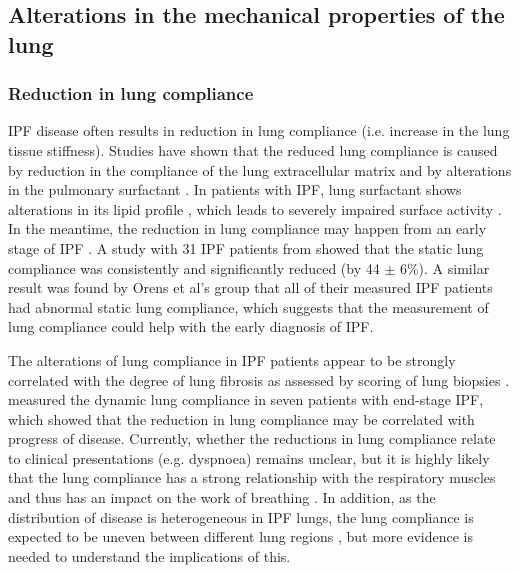 \subsection{Alterations in the mechanical properties of the lung} \label{MechanicalAlteration}
\subsubsection{Reduction in lung compliance}
IPF disease often results in reduction in lung compliance (i.e. increase in the lung tissue stiffness). Studies have shown that the reduced lung compliance is caused by reduction in the compliance of the lung extracellular matrix and by alterations in the pulmonary surfactant \citep{plantier2018physiology}. In patients with IPF, lung surfactant shows alterations in its lipid profile \citep{gunther1999surfactant, schmidt2002altered}, which leads to severely impaired surface activity \citep{gunther1999surfactant}. In the meantime, the reduction in lung compliance may happen from an early stage of IPF \citep{plantier2018physiology}. A study with 31 IPF patients from \cite{zielonka2010angiogenic} showed that the static lung compliance was consistently and significantly reduced (by 44 $\pm$ 6\%). A similar result was found by Orens et al's group \citep{orens1995sensitivity} that all of their measured IPF patients had abnormal static lung compliance, which suggests that the measurement of lung compliance could help with the early diagnosis of IPF.

The alterations of lung compliance in IPF patients appear to be strongly correlated with the degree of lung fibrosis as assessed by scoring of lung biopsies \citep{fulmer1979morphologic,plantier2018physiology}. \cite{nava1999lung} measured the dynamic lung compliance in seven patients with end-stage IPF, which showed that the reduction in lung compliance may be correlated with progress of disease. Currently, whether the reductions in lung compliance relate to clinical presentations (e.g. dyspnoea) remains unclear, but it is highly likely that the lung compliance has a strong relationship with the respiratory muscles and thus has an impact on the work of breathing \citep{plantier2018physiology}. In addition, as the distribution of disease is heterogeneous in IPF lungs, the lung compliance is expected to be uneven between different lung regions \citep{organ2015structural}, but more evidence is needed to understand the implications of this.


